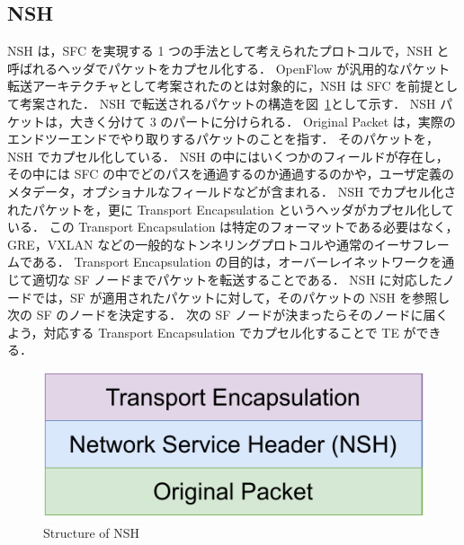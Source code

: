 \subsection*{NSH}
\label{sbsection:nsh}
NSH は，SFC を実現する 1 つの手法として考えられたプロトコルで，NSH と呼ばれるヘッダでパケットをカプセル化する．
OpenFlow が汎用的なパケット転送アーキテクチャとして考案されたのとは対象的に，NSH は SFC を前提として考案された．
NSH で転送されるパケットの構造を図~\ref*{fig:nsh}として示す．
NSH パケットは，大きく分けて 3 のパートに分けられる．
Original Packet は，実際のエンドツーエンドでやり取りするパケットのことを指す．
そのパケットを，NSH でカプセル化している．
NSH の中にはいくつかのフィールドが存在し，その中には SFC の中でどのパスを通過するのか通過するのかや，ユーザ定義のメタデータ，オプショナルなフィールドなどが含まれる．
NSH でカプセル化されたパケットを，更に Transport Encapsulation というヘッダがカプセル化している．
この Transport Encapsulation は特定のフォーマットである必要はなく，GRE，VXLAN などの一般的なトンネリングプロトコルや通常のイーサフレームである．
Transport Encapsulation の目的は，オーバーレイネットワークを通じて適切な SF ノードまでパケットを転送することである．
NSH に対応したノードでは，SF が適用されたパケットに対して，そのパケットの NSH を参照し次の SF のノードを決定する．
次の SF ノードが決まったらそのノードに届くよう，対応する Transport Encapsulation でカプセル化することで TE ができる．
\begin{figure}[t]
    \centering
    \includegraphics[width=0.95\linewidth]{img/nsh.pdf}
    \caption{Structure of NSH}
    \label{fig:nsh}
\end{figure}

